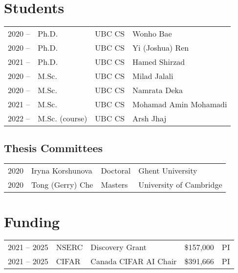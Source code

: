 \documentclass[11pt,sans]{moderncv}
\begin{document}
\section{Students}
\begin{tabular}{l@{\hskip .2in}l@{\hskip .2in}l@{\hskip .2in}l@{\hskip .2in}l}
    2020 -- & Ph.D. & UBC CS & Wonho Bae &\\
    2020 -- & Ph.D. & UBC CS & Yi (Joshua) Ren &\\
    2021 -- & Ph.D. & UBC CS & Hamed Shirzad &\\
    2020 -- & M.Sc. & UBC CS & Milad Jalali &\\
    2020 -- & M.Sc. & UBC CS & Namrata Deka &\\
    2021 -- & M.Sc. & UBC CS & \multicolumn{2}{l}{Mohamad Amin Mohamadi} \\
    2022 -- & M.Sc. (course) & UBC CS & Arsh Jhaj \\
\end{tabular}

\subsection{Thesis Committees}
\begin{tabular}{l@{\hskip .2in}l@{\hskip .2in}l@{\hskip .2in}l}
    2020 & Iryna Korshunova & Doctoral & Ghent University \\
    2020 & Tong (Gerry) Che & Masters & University of Cambridge
\end{tabular}

\section{Funding}
\begin{tabular}{l@{\hskip .2in}l@{\hskip .2in}l@{\hskip .2in}l@{\hskip .2in}l}
  2021 -- 2025 & NSERC & Discovery Grant & \$157,000 & PI \\
  2021 -- 2025 & CIFAR & Canada CIFAR AI Chair & \$391,666 & PI \\
\end{tabular}

\clearpage  %
\end{document}
